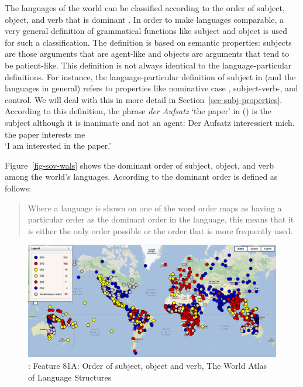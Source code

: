 The languages of the world can be classified according to the order of subject, object, and verb
that is dominant \citep{Greenberg63a-u}. In order to make languages comparable, a very general definition of grammatical
functions like subject and object is used
for such a classification. The definition is based on semantic properties: subjects are those
arguments that are agent-like and objects are arguments that tend to be patient-like. This definition
is not always identical to the language-particular definitions. For instance, the
language-particular definition of subject in  (and the  languages in general)
refers to properties like nominative case \citep{Reis82}, subject-verb-, and control. We will deal with this in more
detail in Section~\ref{sec-subj-properties}. According to this definition, the phrase \emph{der
  Aufsatz} `the paper' in () is the subject although it is inanimate and not an agent: 
\ea
\gll Der Aufsatz interessiert mich.\\
     the paper   interests    me\\
\glt `I am interested in the paper.'
\z

\noindent
Figure~\vref{fig-sov-wals} shows the dominant order of subject, object, and verb among the world's languages.
According to \citet{Dryer2013a} the dominant order is defined as follows:

\largerpage
\begin{quote}
Where a language is shown on one of the word order maps as having a particular order as the dominant
order in the language, this means that it is either the only order possible or the order
that is more frequently used. \citep{Dryer2013a}
\end{quote}
%
%
%
\begin{figure}
\includegraphics[width=\textwidth]{Pictures/WALS-SOV}
\caption{\label{fig-sov-wals}\citet[Section~1]{Dryer2013c}: Feature 81A: Order of subject, object and verb, The World Atlas of Language Structures} 
\end{figure}

